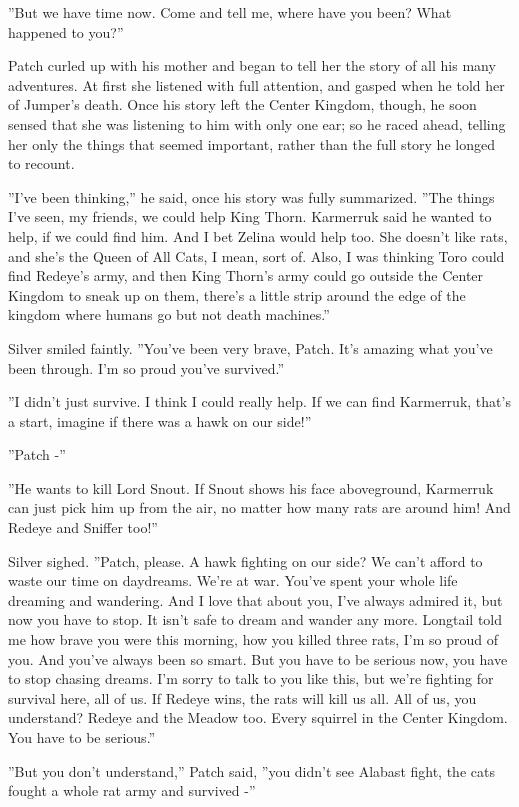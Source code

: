\documentclass[11pt]{article}
\begin{document}
 ''But we have time now. Come and tell me, where have you been? What happened to you?''\par
 Patch curled up with his mother and began to tell her the story of all his many adventures. At first she listened with full attention, and gasped when he told her of Jumper's death. Once his story left the Center Kingdom, though, he soon sensed that she was listening to him with only one ear; so he raced ahead, telling her only the things that seemed important, rather than the full story he longed to recount.\par
 ''I've been thinking,'' he said, once his story was fully summarized. ''The things I've seen, my friends, we could help King Thorn. Karmerruk said he wanted to help, if we could find him. And I bet Zelina would help too. She doesn't like rats, and she's the Queen of All Cats, I mean, sort of. Also, I was thinking Toro could find Redeye's army, and then King Thorn's army could go outside the Center Kingdom to sneak up on them, there's a little strip around the edge of the kingdom where humans go but not death machines.''\par
 Silver smiled faintly. ''You've been very brave, Patch. It's amazing what you've been through. I'm so proud you've survived.''\par
 ''I didn't just survive. I think I could really help. If we can find Karmerruk, that's a start, imagine if there was a hawk on our side!''\par
 ''Patch -''\par
 ''He wants to kill Lord Snout. If Snout shows his face aboveground, Karmerruk can just pick him up from the air, no matter how many rats are around him! And Redeye and Sniffer too!''\par
 Silver sighed. ''Patch, please. A hawk fighting on our side? We can't afford to waste our time on daydreams. We're at war. You've spent your whole life dreaming and wandering. And I love that about you, I've always admired it, but now you have to stop. It isn't safe to dream and wander any more. Longtail told me how brave you were this morning, how you killed three rats, I'm so proud of you. And you've always been so smart. But you have to be serious now, you have to stop chasing dreams. I'm sorry to talk to you like this, but we're fighting for survival here, all of us. If Redeye wins, the rats will kill us all. All of us, you understand? Redeye and the Meadow too. Every squirrel in the Center Kingdom. You have to be serious.''\par
 ''But you don't understand,'' Patch said, ''you didn't see Alabast fight, the cats fought a whole rat army and survived -''\par
\end{document}
